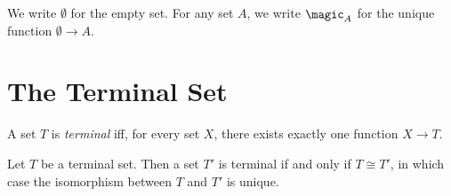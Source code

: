 We write $\emptyset$ for the empty set. For any set $A$, we write $\magic_A$ for the unique function $\emptyset \rightarrow A$.

\section{The Terminal Set}

\begin{df}
  A set $T$ is \emph{terminal} iff, for every set $X$, there exists exactly one function $X \rightarrow T$.
\end{df}

\begin{prop}
  Let $T$ be a terminal set. Then a set $T'$ is terminal if and only if $T \cong T'$, in which case the isomorphism between $T$ and $T'$ is unique.
\end{prop}

